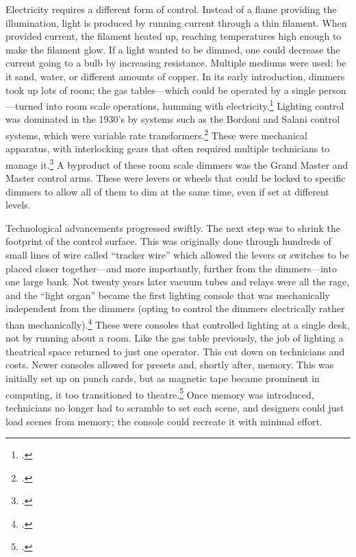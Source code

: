 \documentclass[
    12pt,
    twoside,
    bibstyle=chicago,
    headerstyle=uppercase,
	bibfile=biblatex_updating.bib
]{reedthesis}
\begin{document}

Electricity requires a different form of control. Instead of a flame providing the illumination, light is produced by running current through a thin filament. When provided current, the filament heated up, reaching temperatures high enough to make the filament glow. If a light wanted to be dimmed, one could decrease the current going to a bulb by increasing resistance. Multiple mediums were used: be it sand, water, or different amounts of copper. In its early introduction, dimmers took up lots of room; the gas tables---which could be operated by a single person---turned into room scale operations, humming with electricity.\footcite[p. 179]{pilbrowStageLightingDesign1997} %
 Lighting control was dominated in the 1930's by systems such as the Bordoni and Salani control systems, which were variable rate transformers.\footcite[p. 207]{kellerLightFantasticArt2006} These were mechanical apparatus, with interlocking gears that often required multiple technicians to manage it.\footcite[p. 84-89]{benthamStageLighting1980} A byproduct of these room scale dimmers was the Grand Master and Master control arms. These were levers or wheels that could be locked to specific dimmers to allow all of them to dim at the same time, even if set at different levels.

Technological advancements progressed swiftly. The next step was to shrink the footprint of the control surface. This was originally done through hundreds of small lines of wire called “tracker wire” which allowed the levers or switches to be placed closer together---and more importantly, further from the dimmers---into one large bank. Not twenty years later vacuum tubes and relays were all the rage, and the “light organ” became the first lighting console that was mechanically independent from the dimmers (opting to control the dimmers electrically rather than mechanically).\footcite[480]{kellerLightFantasticArt2006} These were consoles that controlled lighting at a single desk, not by running about a room. Like the gas table previously, the job of lighting a theatrical space returned to just one operator. This cut down on technicians and costs. Newer consoles allowed for presets and, shortly after, memory. This was initially set up on punch cards, but as magnetic tape became prominent in computing, it too transitioned to theatre.\footcite[481]{kellerLightFantasticArt2006} Once memory was introduced, technicians no longer had to scramble to set each scene, and designers could just load scenes from memory; the console could recreate it with minimal effort.
\end{document}
